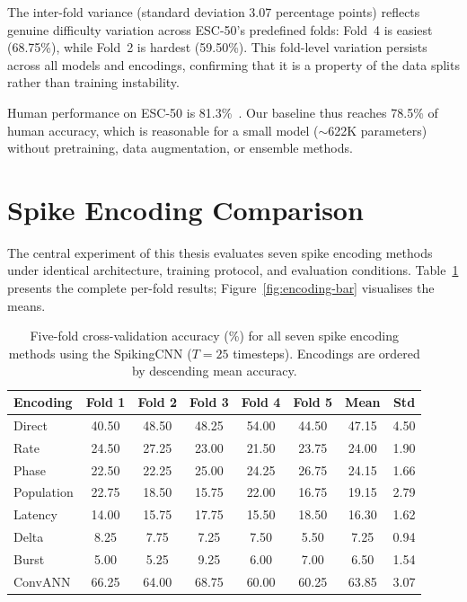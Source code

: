 The inter-fold variance (standard deviation 3.07 percentage points) reflects genuine difficulty variation across ESC-50's predefined folds: Fold~4 is easiest (68.75\%), while Fold~2 is hardest (59.50\%). This fold-level variation persists across all models and encodings, confirming that it is a property of the data splits rather than training instability.

Human performance on ESC-50 is 81.3\%~\citep{piczak2015esc50}. Our baseline thus reaches 78.5\% of human accuracy, which is reasonable for a small model ($\sim$622K parameters) without pretraining, data augmentation, or ensemble methods.

\section{Spike Encoding Comparison}
\label{sec:encoding-results}

The central experiment of this thesis evaluates seven spike encoding methods under identical architecture, training protocol, and evaluation conditions. Table~\ref{tab:encoding-comparison} presents the complete per-fold results; Figure~\ref{fig:encoding-bar} visualises the means.

\begin{table}[t]
\centering
\caption{Five-fold cross-validation accuracy (\%) for all seven spike encoding methods using the SpikingCNN ($T = 25$ timesteps). Encodings are ordered by descending mean accuracy.}
\label{tab:encoding-comparison}
\small
\begin{tabular}{@{}lccccccc@{}}
\toprule
\textbf{Encoding} & \textbf{Fold 1} & \textbf{Fold 2} & \textbf{Fold 3} & \textbf{Fold 4} & \textbf{Fold 5} & \textbf{Mean} & \textbf{Std} \\
\midrule
Direct      & 40.50 & 48.50 & 48.25 & 54.00 & 44.50 & 47.15 & 4.50 \\
Rate        & 24.50 & 27.25 & 23.00 & 21.50 & 23.75 & 24.00 & 1.90 \\
Phase       & 22.50 & 22.25 & 25.00 & 24.25 & 26.75 & 24.15 & 1.66 \\
Population  & 22.75 & 18.50 & 15.75 & 22.00 & 16.75 & 19.15 & 2.79 \\
Latency     & 14.00 & 15.75 & 17.75 & 15.50 & 18.50 & 16.30 & 1.62 \\
Delta       &  8.25 &  7.75 &  7.25 &  7.50 &  5.50 &  7.25 & 0.94 \\
Burst       &  5.00 &  5.25 &  9.25 &  6.00 &  7.00 &  6.50 & 1.54 \\
\midrule
ConvANN     & 66.25 & 64.00 & 68.75 & 60.00 & 60.25 & 63.85 & 3.07 \\
\bottomrule
\end{tabular}
\end{table}

